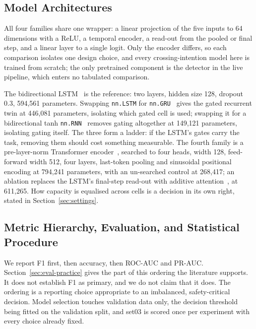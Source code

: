 \documentclass[mti,article,submit,moreauthors]{Definitions/mdpi}
\begin{document}
\subsection{Model Architectures}

All four families share one wrapper: a linear projection of the five inputs to 64 dimensions with a ReLU, a temporal encoder, a read-out from the pooled or final step, and a linear layer to a single logit. Only the encoder differs, so each comparison isolates one design choice, and every crossing-intention model here is trained from scratch; the only pretrained component is the detector in the live pipeline, which enters no tabulated comparison.

The bidirectional LSTM~\citep{hochreiter1997lstm,schuster1997bilstm} is the reference: two layers, hidden size 128, dropout 0.3, 594,561 parameters. Swapping \texttt{nn.LSTM} for \texttt{nn.GRU}~\citep{cho2014gru,chung2014gru} gives the gated recurrent twin at 446,081 parameters, isolating which gated cell is used; swapping it for a bidirectional tanh \texttt{nn.RNN}~\citep{elman1990rnn,rumelhart1986backprop} removes gating altogether at 149,121 parameters, isolating gating itself. The three form a ladder: if the LSTM's gates carry the task, removing them should cost something measurable. The fourth family is a pre-layer-norm Transformer encoder~\citep{vaswani2017attention,xiong2020prelayernorm}, searched to four heads, width 128, feed-forward width 512, four layers, last-token pooling and sinusoidal positional encoding at 794,241 parameters, with an un-searched control at 268,417; an ablation replaces the LSTM's final-step read-out with additive attention~\citep{bahdanau2015attention}, at 611,265. How capacity is equalised across cells is a decision in its own right, stated in Section~\ref{sec:settings}.

\subsection{Metric Hierarchy, Evaluation, and Statistical Procedure}

We report F1 first, then accuracy, then ROC-AUC and PR-AUC. Section~\ref{sec:eval-practice} gives the part of this ordering the literature supports. It does not establish F1 as primary, and we do not claim that it does. The ordering is a reporting choice appropriate to an imbalanced, safety-critical decision. Model selection touches validation data only, the decision threshold being fitted on the validation split, and set03 is scored once per experiment with every choice already fixed.
\end{document}
